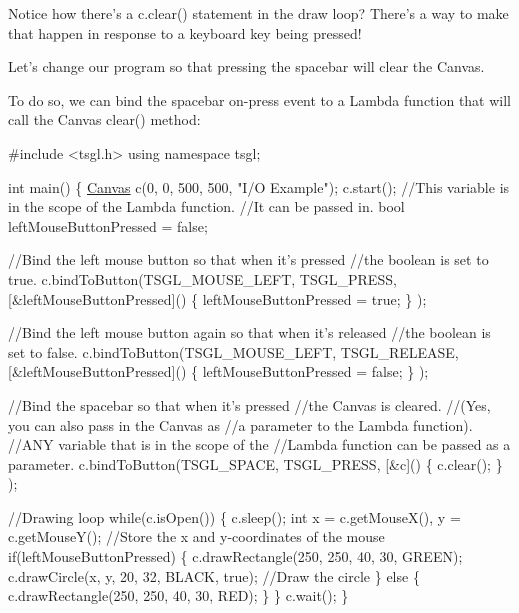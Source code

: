 Notice how there's a {\ttfamily c.\-clear()} statement in the draw loop? There's a way to make that happen in response to a keyboard key being pressed!

Let’s change our program so that pressing the spacebar will clear the Canvas.

To do so, we can bind the spacebar on-\/press event to a Lambda function that will call the Canvas {\ttfamily clear()} method\-:


\begin{DoxyCode}
\textcolor{preprocessor}{#include <tsgl.h>}
\textcolor{keyword}{using namespace }tsgl;

\textcolor{keywordtype}{int} main() \{
  \hyperlink{classtsgl_1_1_canvas}{Canvas} c(0, 0, 500, 500, \textcolor{stringliteral}{"I/O Example"});
  c.start();
  \textcolor{comment}{//This variable is in the scope of the Lambda function.}
  \textcolor{comment}{//It can be passed in.}
  \textcolor{keywordtype}{bool} leftMouseButtonPressed = \textcolor{keyword}{false};

  \textcolor{comment}{//Bind the left mouse button so that when it's pressed }
  \textcolor{comment}{//the boolean is set to true.}
  c.bindToButton(TSGL\_MOUSE\_LEFT, TSGL\_PRESS, 
                    [&leftMouseButtonPressed]() \{
                          leftMouseButtonPressed = \textcolor{keyword}{true};
                    \}
                );

  \textcolor{comment}{//Bind the left mouse button again so that when it's released }
  \textcolor{comment}{//the boolean is set to false.}
  c.bindToButton(TSGL\_MOUSE\_LEFT, TSGL\_RELEASE, 
                    [&leftMouseButtonPressed]() \{
                          leftMouseButtonPressed = \textcolor{keyword}{false};
                    \}
                );

  \textcolor{comment}{//Bind the spacebar so that when it's pressed }
  \textcolor{comment}{//the Canvas is cleared.}
  \textcolor{comment}{//(Yes, you can also pass in the Canvas as }
  \textcolor{comment}{//a parameter to the Lambda function).}
  \textcolor{comment}{//ANY variable that is in the scope of the }
  \textcolor{comment}{//Lambda function can be passed as a parameter.}
  c.bindToButton(TSGL\_SPACE, TSGL\_PRESS, 
                    [&c]() \{
                      c.clear();
                    \}
                );

  \textcolor{comment}{//Drawing loop}
  \textcolor{keywordflow}{while}(c.isOpen()) \{
    c.sleep();
    \textcolor{keywordtype}{int} x = c.getMouseX(), y = c.getMouseY();  \textcolor{comment}{//Store the x and y-coordinates of the mouse}
    \textcolor{keywordflow}{if}(leftMouseButtonPressed) \{
      c.drawRectangle(250, 250, 40, 30, GREEN);
      c.drawCircle(x, y, 20, 32, BLACK, \textcolor{keyword}{true});  \textcolor{comment}{//Draw the circle}
    \} \textcolor{keywordflow}{else} \{
      c.drawRectangle(250, 250, 40, 30, RED);
    \}
  \}
  c.wait();
\}
\end{DoxyCode}


